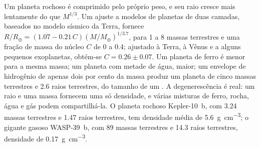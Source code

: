Um planeta rochoso é comprimido pelo próprio peso, e seu raio cresce
mais lentamente do que $M^{1/3}$. Um ajuste a modelos de planetas de duas camadas, baseados
no modelo sísmico da Terra, fornece $R/R_\oplus = (1.07 - 0.21\,C)
(M/M_\oplus)^{1/3.7}$, para 1 a 8 massas terrestres e uma fração de massa do núcleo
$C$ de 0 a 0.4; ajustado à Terra, à Vênus e a alguns pequenos
exoplanetas, obtém-se $C = 0.26 \pm 0.07$. Um
planeta de ferro é menor para a mesma massa; um planeta com metade de água, maior;
um envelope de hidrogênio de apenas dois por cento da massa produz um planeta de
cinco massas terrestres e \num{2.6} raios terrestres, do tamanho de um
. A degenerescência é real: um raio e uma massa fornecem uma só
densidade, e várias misturas de ferro, rocha, água e gás podem compartilhá-la.
O planeta rochoso Kepler-10~b, com 3.24 massas terrestres e 1.47 raios terrestres,
tem densidade média de \qty{5.6}{g.cm^{-3}}; o gigante gasoso WASP-39~b,
com 89 massas terrestres e 14.3 raios terrestres, densidade de \qty{0.17}{g.cm^{-3}}.

